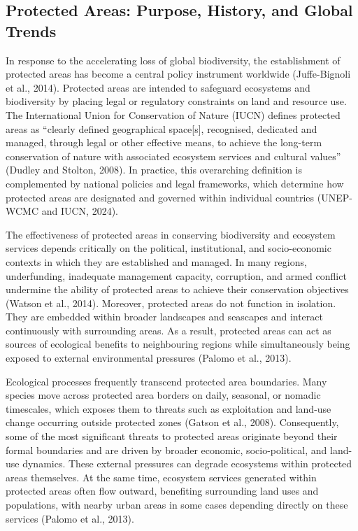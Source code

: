 \documentclass[12pt]{article}
\theoremstyle{break} %
\begin{document}
\subsection{Protected Areas: Purpose, History, and Global Trends} \label{pa-purpose-history}

In response to the accelerating loss of global biodiversity, the establishment of protected areas has become a central policy instrument worldwide (Juffe-Bignoli et al., 2014). Protected areas are intended to safeguard ecosystems and biodiversity by placing legal or regulatory constraints on land and resource use. The International Union for Conservation of Nature (IUCN) defines protected areas as “clearly defined geographical space[s], recognised, dedicated and managed, through legal or other effective means, to achieve the long-term conservation of nature with associated ecosystem services and cultural values” (Dudley and Stolton, 2008). In practice, this overarching definition is complemented by national policies and legal frameworks, which determine how protected areas are designated and governed within individual countries (UNEP-WCMC and IUCN, 2024).

The effectiveness of protected areas in conserving biodiversity and ecosystem services depends critically on the political, institutional, and socio-economic contexts in which they are established and managed. In many regions, underfunding, inadequate management capacity, corruption, and armed conflict undermine the ability of protected areas to achieve their conservation objectives (Watson et al., 2014). Moreover, protected areas do not function in isolation. They are embedded within broader landscapes and seascapes and interact continuously with surrounding areas. As a result, protected areas can act as sources of ecological benefits to neighbouring regions while simultaneously being exposed to external environmental pressures (Palomo et al., 2013).

Ecological processes frequently transcend protected area boundaries. Many species move across protected area borders on daily, seasonal, or nomadic timescales, which exposes them to threats such as exploitation and land-use change occurring outside protected zones (Gatson et al., 2008). Consequently, some of the most significant threats to protected areas originate beyond their formal boundaries and are driven by broader economic, socio-political, and land-use dynamics. These external pressures can degrade ecosystems within protected areas themselves. At the same time, ecosystem services generated within protected areas often flow outward, benefiting surrounding land uses and populations, with nearby urban areas in some cases depending directly on these services (Palomo et al., 2013).
\end{document}
